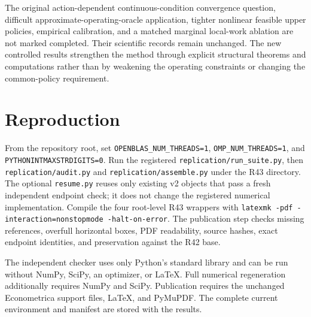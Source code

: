 The original action-dependent continuous-condition convergence question, difficult approximate-operating-oracle application, tighter nonlinear feasible upper policies, empirical calibration, and a matched marginal local-work ablation are not marked completed. Their scientific records remain unchanged. The new controlled results strengthen the method through explicit structural theorems and computations rather than by weakening the operating constraints or changing the common-policy requirement.

\section{Reproduction}
From the repository root, set \texttt{OPENBLAS\_NUM\_THREADS=1}, \texttt{OMP\_NUM\_THREADS=1}, and \texttt{PYTHONINTMAXSTRDIGITS=0}. Run the registered \texttt{replication/run\_suite.py}, then \texttt{replication/audit.py} and \texttt{replication/assemble.py} under the R43 directory. The optional \texttt{resume.py} reuses only existing v2 objects that pass a fresh independent endpoint check; it does not change the registered numerical implementation. Compile the four root-level R43 wrappers with \texttt{latexmk -pdf -interaction=nonstopmode -halt-on-error}. The publication step checks missing references, overfull horizontal boxes, PDF readability, source hashes, exact endpoint identities, and preservation against the R42 base.

The independent checker uses only Python's standard library and can be run without NumPy, SciPy, an optimizer, or LaTeX. Full numerical regeneration additionally requires NumPy and SciPy. Publication requires the unchanged Econometrica support files, LaTeX, and PyMuPDF. The complete current environment and manifest are stored with the results.

